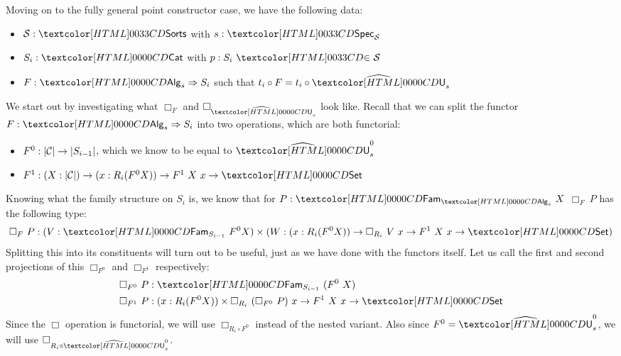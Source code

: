 Moving on to the fully general point constructor case, we have the
following data:
%
\begin{itemize}
\item $\Ss : \sortsty$ with $s : \specty_{\Ss}$
\item $S_i : \Cat$ with $p : \sortsin{S_i}{\Ss}$
\item $F : \Func{\Alg_s}{S_i}$ such that $t_i \circ F = t_i \circ \extendfunc{\Und}_s$
\end{itemize}

We start out by investigating what $\Box_F$ and $\Box_{\extendfunc{\Und}_s}$ look
like. Recall that we can split the functor $F : \Func{\Alg_s}{S_i}$
into two operations, which are both functorial:
\begin{itemize}
\item $F^0 : | \mathcal{C} | \to |S_{i-1}|$, which we know to be equal to $\extendfunc{\Und}^0_s$
\item
  $F^1 : (X : | \Cc |) \to (x : R_i (F^0 X)) \to F^1\ X\ x \to \Set$
\end{itemize}

Knowing what the family structure on $S_i$ is, we know that for
$P : \Fam_{\Alg_s}\ X$ $\Box_F\ P$ has the following type:
$$
\Box_F\ P : (V : \Fam_{S_{i-1}}\ F^0X) \times (W : (x : R_i (F^0 X)) \to \Box_{R_i}\ V\ x \to F^1\ X\ x \to \Set)
$$
Splitting this into its constituents will turn out to be useful, just
as we have done with the functors itself. Let us call the first and
second projections of this $\Box_{F^0}$ and $\Box_{F^1}$ respectively:
%
\begin{align*}
  &\Box_{F^0}\ P : \Fam_{S_{i-1}}\ (F^0\ X) \\
  &\Box_{F^1}\ P : (x : R_i (F^0 X)) \times \Box_{R_i}\ (\Box_{F^0}\ P)\ x \to F^1\ X\ x \to \Set
\end{align*}
%
Since the $\Box$ operation is functorial, we will use
$\Box_{R_i \circ F^0}$ instead of the nested variant. Also since
$F^0 = \extendfunc{\Und}^0_s$, we will use $\Box_{R_i \circ \extendfunc{\Und}^0_s}$.

